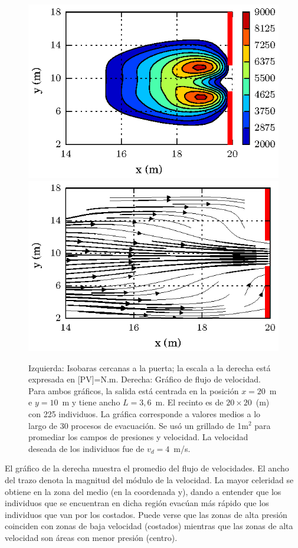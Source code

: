 \begin{figure}[H]
    \centering
    \includegraphics[scale=1]{figuras/press_225p_v4_onedoor_3_6.eps}
        \includegraphics[scale=1]{figuras/flujo_door_3_6m.eps}
    \caption[width=5cm]{Izquierda: Isobaras cercanas a la puerta; la escala a la derecha está expresada en [PV]=N.m. Derecha: Gráfico de flujo de velocidad. Para ambos gráficos, la salida está centrada en la posición $x=20$~m e $y=10$~m y tiene ancho $L=3,6$~m. El recinto es de $20\times 20$~(m) con 225 individuos. La gráfica corresponde a valores medios a lo largo de 30 procesos de evacuación. Se usó un grillado de 1m$^2$ para promediar los campos de presiones y velocidad. La velocidad deseada de los individuos fue de $v_d=4$~m/s.}
    \label{isobaras_flujo_3_6m}
\end{figure}

El gráfico de la derecha muestra el promedio del flujo de velocidades. El ancho del trazo denota la magnitud del módulo de la velocidad. La mayor celeridad se obtiene en la zona del medio (en la coordenada y), dando a entender que los individuos que se encuentran en dicha región evacúan más rápido que los individuos que van por los costados. 
Puede verse que las zonas de alta presión coinciden con zonas de baja velocidad (costados) mientras que las zonas de alta velocidad son áreas con menor presión (centro). 

